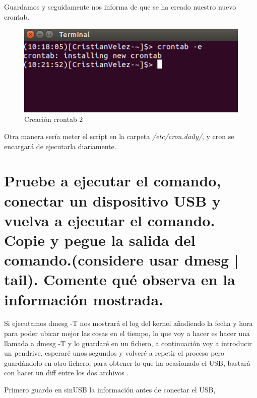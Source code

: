 Guardamos y seguidamente nos informa de que se ha creado nuestro nuevo crontab.

\begin{figure}[H] %
	\centering
	\includegraphics[scale=0.5]{pics/crontab2.png}  %
	\caption{Creación crontab 2} \label{fig:figura2}
\end{figure}

Otra manera sería meter el script en la carpeta \textit{/etc/cron.daily/}, y cron \cite{cron} se encargará de ejecutarla diariamente.



\section[Cuestión 3]{ Pruebe a ejecutar el comando, conectar un dispositivo USB y vuelva a ejecutar el comando. Copie y pegue la salida del comando.(considere usar dmesg | tail). Comente qué observa en la información	mostrada.}

Si ejecutamos dmesg -T nos mostrará el log del kernel añadiendo la fecha y hora para poder ubicar mejor las cosas en el tiempo, lo que voy a hacer es hacer una llamada a dmesg -T y lo guardaré en un fichero, a continuación voy a introducir un pendrive, esperaré unos segundos y volveré a repetir el proceso pero guardándolo en otro fichero, para obtener lo que ha ocasionado el USB, bastará con hacer un diff entre los dos archivos .

Primero guardo en sinUSB la información antes de conectar el USB,

